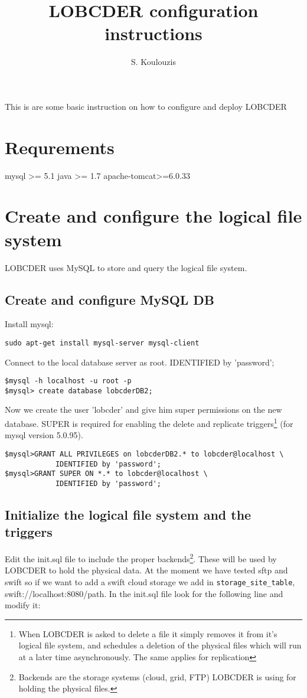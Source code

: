 \documentclass[a4paper,10pt]{article}
\title{LOBCDER configuration instructions}
\author{S. Koulouzis}
\date{}
\begin{document}
\maketitle
This is are some basic instruction on how to configure and deploy LOBCDER 

\section{Requrements}
mysql >= 5.1
java >= 1.7
apache-tomcat>=6.0.33


\section{Create and configure the logical file system}
LOBCDER uses MySQL to store and query the logical file system.

\subsection{Create and configure MySQL DB}
Install mysql: 
\begin{lstlisting}
sudo apt-get install mysql-server mysql-client
\end{lstlisting}


Connect to the local database server as root.
IDENTIFIED by 'password';
\begin{lstlisting}
$mysql -h localhost -u root -p
$mysql> create database lobcderDB2;
\end{lstlisting}


Now we create the user 'lobcder' and give him super permissions on the new database. SUPER is required for 
enabling the delete and replicate triggers\footnote{When LOBCDER is asked to delete a file it simply removes it 
from it's logical file system, and schedules a deletion of the physical files which will run at a later time 
asynchronously. The same applies for replication} (for mysql version 5.0.95). 
\begin{lstlisting}
$mysql>GRANT ALL PRIVILEGES on lobcderDB2.* to lobcder@localhost \ 
			IDENTIFIED by 'password';
$mysql>GRANT SUPER ON *.* to lobcder@localhost \
			IDENTIFIED by 'password';
\end{lstlisting}


\subsection{Initialize the logical file system and the triggers}
Edit the init.sql file to include the proper backends\footnote{Backends are the storage systems 
(cloud, grid, FTP) LOBCDER is using for holding the physical files.}. 
These will be used by LOBCDER to hold the physical data. At the moment we have tested sftp and swift so if we want 
to add a swift cloud storage we add in \texttt{storage\_site\_table}, swift://localhost:8080/path. In the 
init.sql file look for the following line and modify it: 
\end{document}
